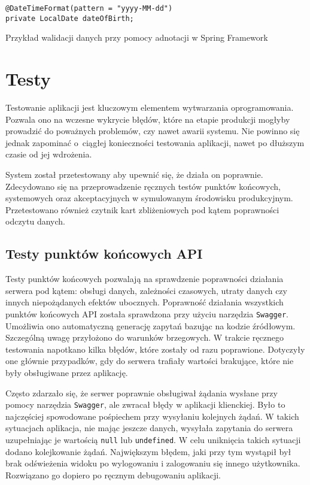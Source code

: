 \begin{listing}[H]
    \begin{verbatim}
@DateTimeFormat(pattern = "yyyy-MM-dd")
private LocalDate dateOfBirth;
\end{verbatim}
    \caption{Przykład walidacji danych przy pomocy adnotacji w Spring Framework}
    \label{lst:validation}
\end{listing}

\section{Testy}

Testowanie aplikacji jest kluczowym elementem wytwarzania oprogramowania. Pozwala ono na wczesne wykrycie błędów, które na etapie produkcji mogłyby prowadzić do poważnych problemów, czy nawet awarii systemu. Nie powinno się jednak zapominać o~ciągłej konieczności testowania aplikacji, nawet po dłuższym czasie od jej wdrożenia.

System został przetestowany aby upewnić się, że działa on poprawnie. Zdecydowano się na przeprowadzenie ręcznych testów punktów końcowych, systemowych oraz akceptacyjnych w symulowanym środowisku produkcyjnym. Przetestowano również czytnik kart zbliżeniowych pod kątem poprawności odczytu danych.

\subsection{Testy punktów końcowych API}

Testy punktów końcowych pozwalają na sprawdzenie poprawności działania serwera pod kątem: obsługi danych, zależności czasowych, utraty danych czy innych niepożądanych efektów ubocznych. Poprawność działania wszystkich punktów końcowych API została sprawdzona przy użyciu narzędzia \texttt{Swagger}. Umożliwia ono automatyczną generację zapytań bazując na kodzie źródłowym. Szczególną uwagę przyłożono do warunków brzegowych. W trakcie ręcznego testowania napotkano kilka błędów, które zostały od razu poprawione. Dotyczyły one głównie przypadków, gdy do serwera trafiały wartości brakujące, które nie były obsługiwane przez aplikację.

Często zdarzało się, że serwer poprawnie obsługiwał żądania wysłane przy pomocy narzędzia \texttt{Swagger}, ale zwracał błędy w aplikacji klienckiej. Było to najczęściej spowodowane pośpiechem przy wysyłaniu kolejnych żądań. W takich sytuacjach aplikacja, nie mając jeszcze danych, wysyłała zapytania do serwera uzupełniając je wartością \texttt{null} lub \texttt{undefined}. W celu uniknięcia takich sytuacji dodano kolejkowanie żądań. Największym błędem, jaki przy tym wystąpił był brak odświeżenia widoku po wylogowaniu i zalogowaniu się innego użytkownika. Rozwiązano go dopiero po ręcznym debugowaniu aplikacji.

